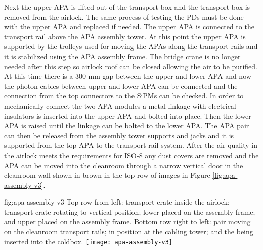 Next the upper APA is lifted out of the transport box and the transport box is removed from the airlock. The same process of testing the PDs must be done with the upper APA and replaced if needed. The upper APA is connected to the transport rail above the APA assembly tower. At this point the upper APA is supported by the trolleys used for moving the APAs along the transport rails and it is stabilized using the APA assembly frame. 
The bridge crane is no longer needed after this step so airlock roof can be closed allowing the air to be purified. At this time there is a 300 \si{mm} gap between the upper and lower APA and now the photon cables between upper and lower APA can be connected and the connection from the top connectors to the SiPMs can be checked. 
In order to mechanically connect the two APA modules a metal linkage with electrical insulators is inserted into the upper APA and bolted into place. Then the lower APA is raised until the linkage can be bolted to the lower APA.  
The APA pair can then be released from the assembly tower supports and jacks and it is supported from the top APA to the transport rail system.
After the air quality in the airlock meets the requirements for ISO-8 any dust covers are removed and the APA can be moved into the cleanroom through a narrow vertical door in the cleanroom wall shown in brown in the top row of images in Figure \ref{fig:apa-assembly-v3}.


\begin{dunefigure}{fig:apa-assembly-v3}
  {Top row from left:   transport crate inside the airlock;  transport crate rotating to vertical position;  lower  placed on the  assembly frame; and upper  placed on the assembly frame. Bottom row right to left:  pair moving on the cleanroom transport rails;  in  position at the cabling tower; and the  being inserted into the coldbox.}
\texttt{[image: apa-assembly-v3]}

\end{dunefigure}

